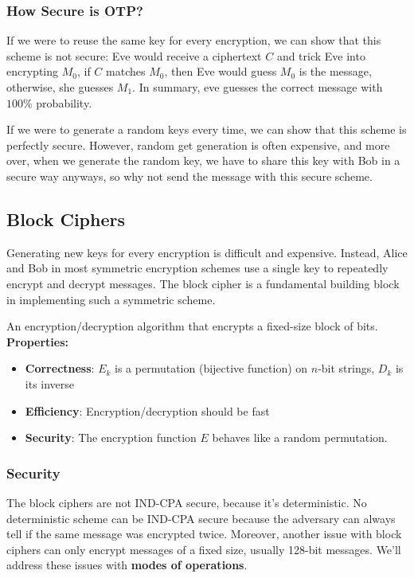 \documentclass{article}
\begin{document}
\subsubsection{How Secure is OTP?}

If we were to reuse the same key for every encryption, we can show that this scheme is not secure: Eve would receive a ciphertext $C$ and trick Eve into encrypting $M_0$, if $C$ matches $M_0$, then Eve would guess $M_0$ is the message, otherwise, she guesses $M_1$. In summary, eve guesses the correct message with $100\%$ probability.

If we were to generate a random keys every time, we can show that this scheme is perfectly secure. However, random get generation is often expensive, and more over, when we generate the random key, we have to share this key with Bob in a secure way anyways, so why not send the message with this secure scheme.

\subsection{Block Ciphers}
Generating new keys for every encryption is difficult and expensive. Instead, Alice and Bob in most symmetric encryption schemes use a single key to repeatedly encrypt and decrypt messages. The block cipher is a fundamental building block in implementing such a symmetric scheme.

\begin{definition}
    An encryption/decryption algorithm that encrypts a fixed-size block of bits.\\
    \textbf{Properties:}
    \begin{itemize}
        \item \textbf{Correctness}: $E_k$ is a permutation (bijective function) on $n$-bit strings, $D_k$ is its inverse
        \item \textbf{Efficiency}: Encryption/decryption should be fast
        \item \textbf{Security}: The encryption function $E$ behaves like a random permutation.
    \end{itemize}
\end{definition}

\subsubsection{Security}
The block ciphers are not IND-CPA secure, because it's deterministic. No deterministic scheme can be IND-CPA secure because the adversary can always tell if the same message was encrypted twice. Moreover, another issue with block ciphers can only encrypt messages of a fixed size, usually 128-bit messages. We'll address these issues with \textbf{modes of operations}.
\end{document}

